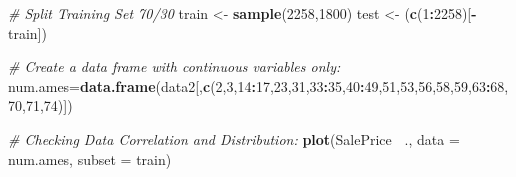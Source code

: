 \documentclass[
]{article}
\newenvironment{Shaded}{\begin{snugshade}}{\end{snugshade}}
\newcommand{\CommentTok}[1]{\textcolor[rgb]{0.56,0.35,0.01}{\textit{#1}}}
\newcommand{\DataTypeTok}[1]{\textcolor[rgb]{0.13,0.29,0.53}{#1}}
\newcommand{\DecValTok}[1]{\textcolor[rgb]{0.00,0.00,0.81}{#1}}
\newcommand{\KeywordTok}[1]{\textcolor[rgb]{0.13,0.29,0.53}{\textbf{#1}}}
\newcommand{\NormalTok}[1]{#1}
\newcommand{\OperatorTok}[1]{\textcolor[rgb]{0.81,0.36,0.00}{\textbf{#1}}}
\newcommand{\StringTok}[1]{\textcolor[rgb]{0.31,0.60,0.02}{#1}}
\begin{document}
\begin{Shaded}
\begin{Highlighting}[]
\CommentTok{# Split Training Set 70/30}
\NormalTok{train <-}\StringTok{ }\KeywordTok{sample}\NormalTok{(}\DecValTok{2258}\NormalTok{,}\DecValTok{1800}\NormalTok{)}
\NormalTok{test <-}\StringTok{ }\NormalTok{(}\KeywordTok{c}\NormalTok{(}\DecValTok{1}\OperatorTok{:}\DecValTok{2258}\NormalTok{)[}\OperatorTok{-}\NormalTok{train])}

\CommentTok{# Create a data frame with continuous variables only:}
\NormalTok{num.ames=}\KeywordTok{data.frame}\NormalTok{(data2[,}\KeywordTok{c}\NormalTok{(}\DecValTok{2}\NormalTok{,}\DecValTok{3}\NormalTok{,}\DecValTok{14}\OperatorTok{:}\DecValTok{17}\NormalTok{,}\DecValTok{23}\NormalTok{,}\DecValTok{31}\NormalTok{,}\DecValTok{33}\OperatorTok{:}\DecValTok{35}\NormalTok{,}\DecValTok{40}\OperatorTok{:}\DecValTok{49}\NormalTok{,}\DecValTok{51}\NormalTok{,}\DecValTok{53}\NormalTok{,}\DecValTok{56}\NormalTok{,}\DecValTok{58}\NormalTok{,}\DecValTok{59}\NormalTok{,}\DecValTok{63}\OperatorTok{:}\DecValTok{68}\NormalTok{,}\DecValTok{70}\NormalTok{,}\DecValTok{71}\NormalTok{,}\DecValTok{74}\NormalTok{)])}

\CommentTok{# Checking Data Correlation and Distribution:}
\KeywordTok{plot}\NormalTok{(SalePrice }\OperatorTok{~}\NormalTok{., }\DataTypeTok{data =}\NormalTok{ num.ames, }\DataTypeTok{subset =}\NormalTok{ train)}
\end{Highlighting}
\end{Shaded}
\end{document}

